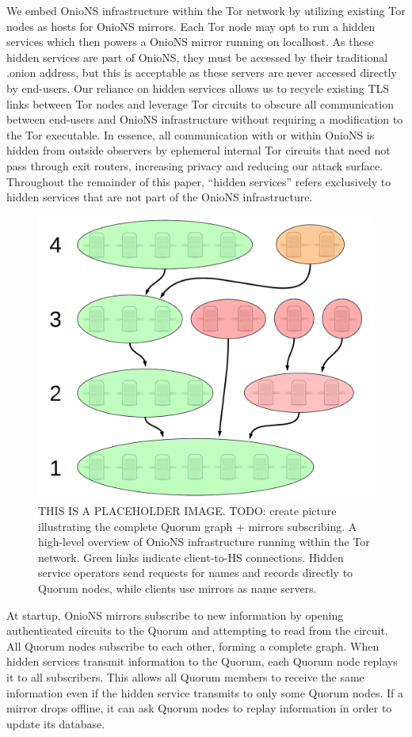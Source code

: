 \documentclass[USenglish,oneside,twocolumn]{article}
\begin{document}
We embed OnioNS infrastructure within the Tor network by utilizing existing Tor nodes as hosts for OnioNS mirrors. Each Tor node may opt to run a hidden services which then powers a OnioNS mirror running on localhost. As these hidden services are part of OnioNS, they must be accessed by their traditional .onion address, but this is acceptable as these servers are never accessed directly by end-users. Our reliance on hidden services allows us to recycle existing TLS links between Tor nodes and leverage Tor circuits to obscure all communication between end-users and OnioNS infrastructure without requiring a modification to the Tor executable. In essence, all communication with or within OnioNS is hidden from outside observers by ephemeral internal Tor circuits that need not pass through exit routers, increasing privacy and reducing our attack surface. Throughout the remainder of this paper, ``hidden services'' refers exclusively to hidden services that are not part of the OnioNS infrastructure.

\begin{figure}[h]
	\centering
	\includegraphics[width=0.4\linewidth]{../assets/images/LucidCharts/Page-chain2.pdf}
	\caption{THIS IS A PLACEHOLDER IMAGE. TODO: create picture illustrating the complete Quorum graph + mirrors subscribing. A high-level overview of OnioNS infrastructure running within the Tor network. Green links indicate client-to-HS connections. Hidden service operators send requests for names and records directly to Quorum nodes, while clients use mirrors as name servers.}
	\label{fig:lotteryTimeline}
\end{figure}

At startup, OnioNS mirrors subscribe to new information by opening authenticated circuits to the Quorum and attempting to read from the circuit. All Quorum nodes subscribe to each other, forming a complete graph. When hidden services transmit information to the Quorum, each Quorum node replays it to all subscribers. This allows all Quorum members to receive the same information even if the hidden service transmits to only some Quorum nodes. If a mirror drops offline, it can ask Quorum nodes to replay information in order to update its database.
\end{document}
